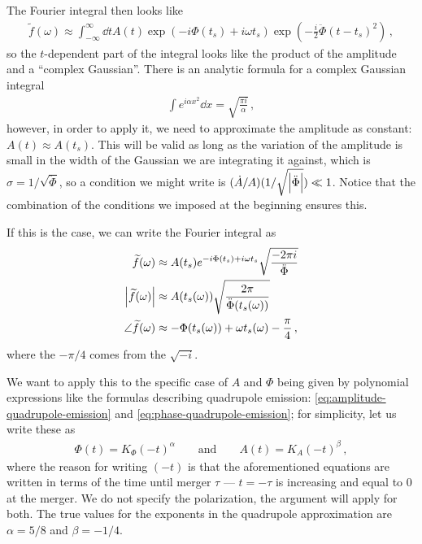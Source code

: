 \documentclass[main.tex]{subfiles}
\begin{document}
The Fourier integral then looks like 
%
\begin{align}
\widetilde{f}(\omega ) \approx \int_{-\infty }^{\infty } \dd{t} A(t) \exp(-i \Phi (t_s) + i \omega t_s) \exp(- \frac{i}{2} \ddot{\Phi} (t-t_s)^2)
\,,
\end{align}
%
so the \(t\)-dependent part of the integral looks like the product of the amplitude and a ``complex Gaussian''. There is an analytic formula for a complex Gaussian integral 
%
\begin{align}
\int e^{i \alpha x^2} \dd{x} = \sqrt{\frac{\pi i}{\alpha }}
\,,
\end{align}
%
however, in order to apply it, we need to approximate the amplitude as constant: \(A(t) \approx A(t_s)\). This will be valid as long as the variation of the amplitude is small in the width of the Gaussian we are integrating it against, which is \(\sigma = 1 / \sqrt{\ddot{\Phi}}\), so a condition we might write is \((\dot{A} / A) (1/\sqrt{\abs{\ddot{\Phi}}}) \ll 1\). 
Notice that the combination of the conditions we imposed at the beginning ensures this.

If this is the case, we can write the Fourier integral as 
%
\begin{align}
\widetilde{f}(\omega ) &\approx A(t_s) e^{- i \Phi (t_s) + i \omega t_s} \sqrt{\frac{- 2 \pi i}{\ddot{\Phi}}}   \\
\abs{\widetilde{f}(\omega )} &\approx A(t_s (\omega )) \sqrt{\frac{2 \pi }{\ddot{\Phi} (t_s (\omega ))}}  \\
\angle \widetilde{f}(\omega ) &\approx - \Phi (t_s (\omega )) + \omega t_s (\omega ) - \frac{\pi}{4}
\,,
\end{align}
%
where the \(- \pi /4\) comes from the \(\sqrt{-i}\). 

We want to apply this to the specific case of \(A\) and \(\Phi \) being given by polynomial expressions like the formulas describing quadrupole emission: \eqref{eq:amplitude-quadrupole-emission} and \eqref{eq:phase-quadrupole-emission}; for simplicity, let us write these as 
%
\begin{align}
\Phi (t) = K_\Phi (- t)^{\alpha }
\qquad \text{and} \qquad
A(t) = K_A (-t)^{\beta }
\,,
\end{align}
%
where the reason for writing \((-t)\) is that the aforementioned equations are written in terms of the time until merger \(\tau \) --- \(t = -\tau \) is increasing and equal to 0 at the merger.
We do not specify the polarization, the argument will apply for both. 
The true values for the exponents in the quadrupole approximation are \(\alpha = 5/8\) and \(\beta = -1/4\). 
\end{document}
